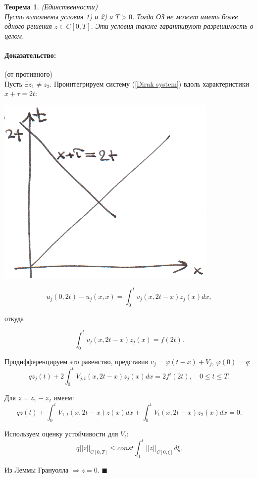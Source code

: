 \documentclass{article}
\newtheorem{theorem}{Теорема}
\newenvironment{proof}{\paragraph{Доказательство:}}{\hfill$\blacksquare$}
\begin{document}
\begin{theorem}
(Единственности)\\
Пусть выполнены условия 1) и 2) и $T > 0$. Тогда ОЗ не может иметь более одного решения $z \in C[0,T]$. Эти условия также гарантируют разрешимость в целом.
\end{theorem}
\begin{proof}
(от противного)\\
Пусть $\exists z_1 \neq z_2$. Проинтегрируем систему (\ref{Dirak system}) вдоль характеристики $x + \tau = 2t$:

\includegraphics[scale=0.8]{pic9_3.png}

\begin{equation*}
	u_j(0,2t) - u_j(x,x) = \int_0^t v_j(x,2t - x) z_j(x) dx,
\end{equation*}

откуда

\begin{equation*}
	\int_0^t v_j(x,2t-x) z_j(x) = f(2t).
\end{equation*}

Продифференцируем это равенство, представив $v_j = \varphi(t-x) + V_j$, $\varphi(0) = q$:
\begin{equation*}
	q z_j(t) + 2 \int_0^t V_{j,t} (x,2t -x) z_j(x) dx = 2f'(2t), \quad 0 \leqslant t \leqslant T.
\end{equation*}

Для $z = z_1 - z_2$ имеем:
\begin{equation*}
	q z(t) + \int_0^t V_{1,t} (x,2t-x) z(x) dx + \int_0^t V_t (x,2t-x) z_2(x) dx = 0.
\end{equation*}

Используем оценку устойчивости для $V_t$:
\begin{equation*}
	q||z||_{C[0,T]} \leqslant const \int_0^t ||z||_{C[0,\xi]} d\xi.
\end{equation*}

Из Леммы Грануолла $\Rightarrow z = 0$.
\end{proof}
\end{document}
